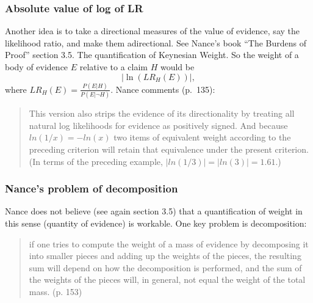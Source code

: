 \documentclass[
  10pt,
  dvipsnames,enabledeprecatedfontcommands]{scrartcl}
\begin{document}

\hypertarget{absolute-value-of-log-of-lr}{%
\subsubsection{Absolute value of log of
LR}\label{absolute-value-of-log-of-lr}}

Another idea is to take a directional measures of the value of evidence,
say the likelihood ratio, and make them adirectional. See Nance's book
``The Burdens of Proof'' section 3.5. The quantification of Keynesian
Weight. So the weight of a body of evidence \(E\) relative to a claim
\(H\) would be \[\vert \ln (LR_H(E)) \vert, \] where
\(LR_H(E)=\frac{P(E \vert H)}{P(E \vert \neg H)}\). Nance comments
(p.~135):

\begin{quote}
This version also strips the evidence of its directionality by treating all natural log likelihoods for evidence as positively signed. And because 
$ln(1/x) = -ln(x)$
two items of equivalent weight according to the preceding criterion will retain that equivalence under the present criterion. (In terms of the preceding example, 
$|ln(1/3)|= |ln(3)| = 1.61.$)
\end{quote}

\hypertarget{nances-problem-of-decomposition}{%
\subsubsection{Nance's problem of
decomposition}\label{nances-problem-of-decomposition}}

Nance does not believe (see again section 3.5) that a quantification of
weight in this sense (quantity of evidence) is workable. One key problem
is decomposition:

\begin{quote}
 if one tries to compute the weight of a mass of evidence by decomposing it into smaller pieces and adding up the weights of the pieces, the resulting sum will depend on how the decomposition is performed, and the sum of the weights of the pieces will, in general, not equal the weight of the total mass. (p. 153)
\end{quote}

\end{document}
